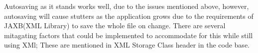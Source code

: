 Autosaving as it stands works well, due to the issues mentioned above, however, autosaving will cause stutters as the application grows due to the requirements of JAXB(XML Library) to save the whole file on change.
There are several mitagating factors that could be implemented to accommodate for this while still using XMl; These are mentioned in XML Storage Class header in the code base. \\